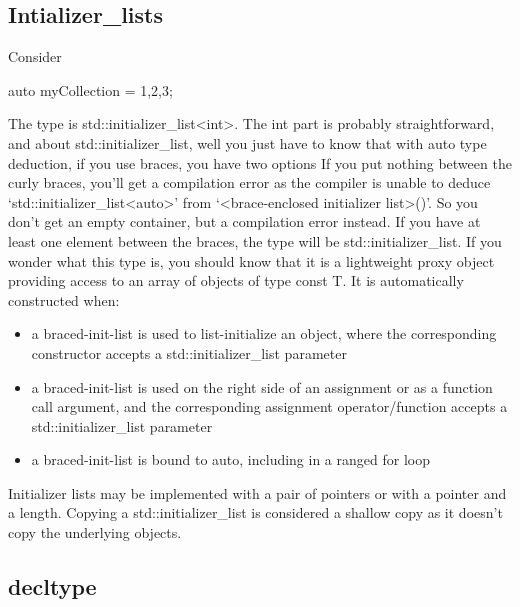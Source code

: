 \documentclass{report}
\begin{document}
 \subsection{Intializer\_lists}
 \bigbreak \noindent 
 Consider
 \bigbreak \noindent 
 \begin{cppcode}
 auto myCollection = {1,2,3};
 \end{cppcode}
 \bigbreak \noindent 
 The type is std::initializer\_list<int>. The int part is probably straightforward, and about std::initializer\_list, well you just have to know that with auto type deduction, if you use braces, you have two options
 \bigbreak \noindent 
 If you put nothing between the curly braces, you’ll get a compilation error as the compiler is unable to deduce ‘std::initializer\_list<auto>’ from ‘<brace-enclosed initializer list>()’. So you don’t get an empty container, but a compilation error instead.
 \bigbreak \noindent 
 If you have at least one element between the braces, the type will be std::initializer\_list.
 \bigbreak \noindent 
 If you wonder what this type is, you should know that it is a lightweight proxy object providing access to an array of objects of type const T. It is automatically constructed when:
 \bigbreak \noindent 
 \begin{itemize}
     \item a braced-init-list is used to list-initialize an object, where the corresponding constructor accepts a std::initializer\_list parameter
     \item a braced-init-list is used on the right side of an assignment or as a function call argument, and the corresponding assignment operator/function accepts a std::initializer\_list parameter
     \item a braced-init-list is bound to auto, including in a ranged for loop
 \end{itemize}
 \bigbreak \noindent 
 Initializer lists may be implemented with a pair of pointers or with a pointer and a length. Copying a std::initializer\_list is considered a shallow copy as it doesn’t copy the underlying objects.

 \bigbreak \noindent 
 \subsection{decltype}
 \bigbreak \noindent 
\end{document}

